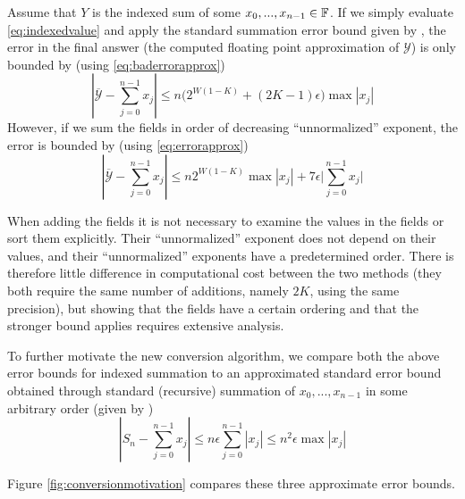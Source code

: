     Assume that $Y$ is the indexed sum of some $x_0, ..., x_{n - 1} \in \mathbb{F}$. If we simply evaluate \eqref{eq:indexedvalue} and apply the standard summation error bound given by \cite{higham}, the error in the final answer (the computed floating point approximation of $\mathcal{Y}$) is only bounded by (using  \eqref{eq:baderrorapprox})
    \begin{equation}
      |\overline{\mathcal{Y}} - \sum_{j=0}^{n-1}x_j| \leq n \bigl(2^{W  (1 - K)} + (2  K - 1)  \epsilon\bigr)\max|x_j|
      \label{eq:baderrorapproxdup}
    \end{equation}
    However, if we sum the fields in order of decreasing ``unnormalized''
    exponent, the error is bounded by (using  \eqref{eq:errorapprox})
    \begin{equation}
      |\overline{\mathcal{Y}} - \sum_{j=0}^{n-1}x_j| \leq n 2^{W  (1 - K)}\max|x_j|  + 7 \epsilon \bigl|\sum\limits_{j = 0}^{n - 1} x_j\bigr|
      \label{eq:errorapproxdup}
    \end{equation}

    When adding the fields it is not necessary to examine the values in the fields or sort them explicitly. Their ``unnormalized'' exponent does not depend on their values, and their ``unnormalized'' exponents have a predetermined order. There is therefore little difference in computational cost between the two methods (they both require the same number of additions, namely $2  K$, using the same precision), but showing that the fields have a certain ordering and that the stronger bound applies requires extensive analysis.

    To further motivate the new conversion algorithm, we compare both the above error bounds for indexed summation to an approximated standard error bound obtained through standard (recursive) summation of $x_0, ..., x_{n - 1}$ in some arbitrary order (given by \cite{higham})
    \begin{equation}
      |S_n - \sum_{j=0}^{n-1}x_j| \leq n \epsilon  \sum\limits_{j = 0}^{n - 1}|x_j| \leq n^2  \epsilon  \max|x_j|
      \label{eq:naiveerrorapproxdup}
    \end{equation}

    Figure \ref{fig:conversionmotivation} compares these three approximate error bounds.

